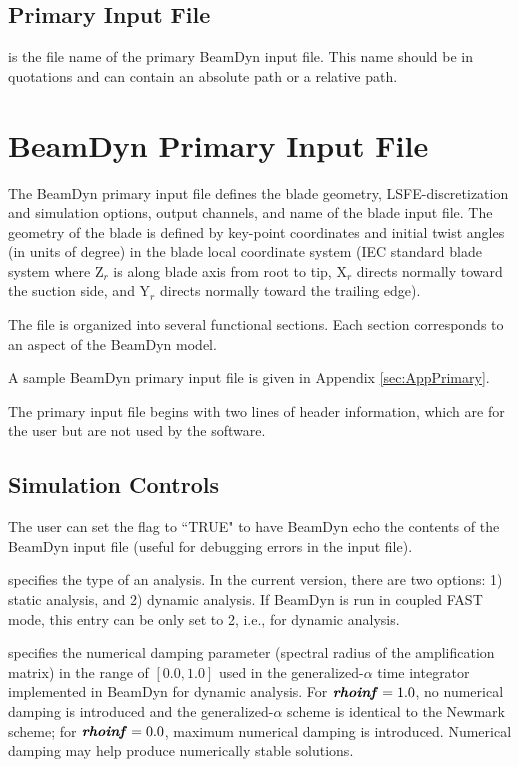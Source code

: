 \subsection{Primary Input File}
 is the file name of the primary BeamDyn input file. 
This name should be in quotations and can contain an absolute path or a relative path. 

\section{BeamDyn Primary Input File}

The BeamDyn primary input file defines the blade geometry, LSFE-discretization and simulation options, output channels, and name of the blade input file. 
The geometry of the blade is defined by key-point coordinates and initial twist angles (in units of degree) in the blade local coordinate system (IEC standard blade system where Z$_r$ is along blade axis from root to tip, X$_r$ directs normally toward the suction side, and Y$_r$ directs normally toward the trailing edge).

The file is organized into several functional sections. 
Each section corresponds to an aspect of the BeamDyn model.

A sample BeamDyn primary input file is given in Appendix \ref{sec:AppPrimary}.

The primary input file begins with two lines of header information, which are for the user but are not used by the software.

\subsection{Simulation Controls}

The user can set the  flag to ``TRUE" to have BeamDyn echo the contents of the BeamDyn input file (useful for debugging errors in the input file). 

 specifies the type of an analysis. 
In the current version, there are two options: 1) static analysis, and 2) dynamic analysis. 
If BeamDyn is run in coupled FAST mode, this entry can be only set to 2, i.e., for dynamic analysis.

 specifies the numerical damping parameter (spectral radius of the amplification matrix) in the range of $[0.0,1.0]$ used in the generalized-$\alpha$ time integrator implemented in BeamDyn for dynamic analysis. 
For $\textbf{\textit{rhoinf}}  = 1.0$, no numerical damping is introduced and the generalized-$\alpha$ scheme is identical to the Newmark scheme; for $\textbf{\textit{rhoinf}}  = 0.0$, maximum numerical damping is introduced. 
Numerical damping may help produce numerically stable solutions.

